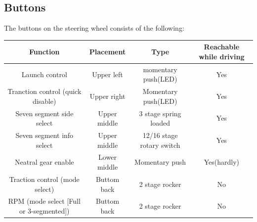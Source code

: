 \subsection*{Buttons}
The buttons on the steering wheel consists of the following:
\begin{center}
\footnotesize
  \begin{tabular}{| c | c | c | c |}
    \hline
    Function & Placement & Type & Reachable while driving  \\ \hline
    Launch control & Upper left & momentary push(LED) & Yes\\ \hline
    Tranction control (quick disable) & Upper right & Momentary push(LED) & Yes\\ \hline
    Seven segment side select & Upper middle & 3 stage spring loaded & Yes\\ \hline
    Seven segment info select & Upper middle & 12/16 stage rotary switch & Yes\\ \hline
    Neatral gear enable & Lower middle & Momentary push & Yes(hardly)\\ \hline
    Traction control (mode select) & Buttom back & 2 stage rocker & No\\ \hline
    RPM (mode select [Full or 3-segmented]) & Buttom back & 2 stage rocker & No\\ \hline

  \end{tabular}
  \label{tab:displaybuttens}  
\end{center}

